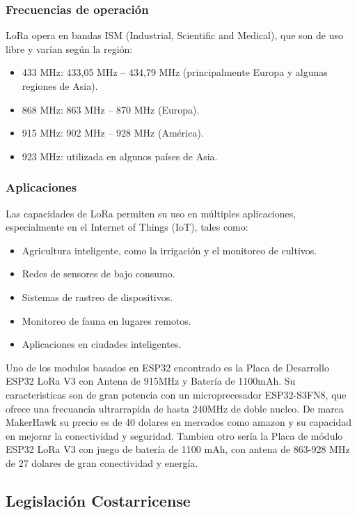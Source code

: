 \documentclass[conference]{IEEEtran}
\begin{document}
\subsubsection{Frecuencias de operación}

LoRa opera en bandas ISM (Industrial, Scientific and Medical), que son de uso libre y varían según la región:

\begin{itemize}
    \item 433 MHz: 433,05 MHz -- 434,79 MHz (principalmente Europa y algunas regiones de Asia).
    \item 868 MHz: 863 MHz -- 870 MHz (Europa).
    \item 915 MHz: 902 MHz -- 928 MHz (América).
    \item 923 MHz: utilizada en algunos países de Asia.
\end{itemize}

\subsubsection{Aplicaciones}

Las capacidades de LoRa permiten su uso en múltiples aplicaciones, especialmente en el Internet of Things (IoT), tales como:

\begin{itemize}
    \item Agricultura inteligente, como la irrigación y el monitoreo de cultivos.
    \item Redes de sensores de bajo consumo.
    \item Sistemas de rastreo de dispositivos.
    \item Monitoreo de fauna en lugares remotos.
    \item Aplicaciones en ciudades inteligentes.
\end{itemize}

Uno de los modulos basados en ESP32 encontrado es la Placa de Desarrollo ESP32 LoRa V3 con Antena de 915MHz y Batería de 1100mAh. Su caracteristicas son de gran potencia con un microprecesador ESP32-S3FN8, que ofrece una frecuancia ultrarrapida de hasta 240MHz de doble nucleo. De marca MakerHawk su precio es de 40 dolares en mercados como amazon y su capacidad en mejorar la conectividad y seguridad. Tambien otro sería la Placa de módulo ESP32 LoRa V3 con juego de batería de 1100 mAh, con antena de 863-928 MHz de 27 dolares de gran conectividad y energía.

\subsection{Legislación Costarricense}
\end{document}
